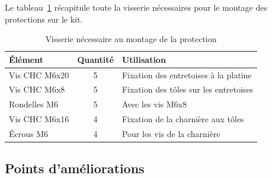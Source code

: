 \begin{minipage}{\textwidth}
    Le tableau~\ref{tab:visserie_protection} récapitule toute la visserie nécessaires pour le montage des protections sur le kit.
    \begin{table}[H]
        \centering
        \renewcommand{\arraystretch}{1.3}
        \begin{tabular}{|l|c|l|}
            \hline
            \textbf{Élément} & \textbf{Quantité} & \textbf{Utilisation}                   \\
            \hline
            Vis CHC M6x20    & 5                 & Fixation des entretoises à la platine  \\
            Vis CHC M6x8     & 5                 & Fixation des tôles sur les entretoises \\
            Rondelles M6     & 5                 & Avec les vis M6x8                      \\
            Vis CHC M6x16    & 4                 & Fixation de la charnière aux tôles     \\
            Écrous M6        & 4                 & Pour les vis de la charnière           \\
            \hline
        \end{tabular}
        \caption{Visserie nécessaire au montage de la protection}
        \label{tab:visserie_protection}
    \end{table}
\end{minipage}
\subsection{Points d'améliorations}